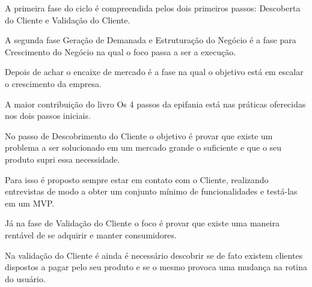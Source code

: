 \par A primeira fase do ciclo é compreendida pelos dois primeiros passos: Descoberta do Cliente e Validação do Cliente.
\par  A segunda fase Geração de Demanada e Estruturação do Negócio é a fase para Crescimento do Negócio na qual o foco passa a ser a execução. 
\par Depois de achar o encaixe de mercado é a fase na qual o objetivo está em escalar o crescimento da empresa.
\par A maior contribuição do livro Os 4 passos da epifania \cite{blank:03} está nas práticas oferecidas nos dois passos iniciais.
\par No passo de Descobrimento do Cliente o objetivo é provar que existe um problema a ser solucionado em um mercado grande o suficiente e que o seu produto supri essa necessidade.
\par Para isso é proposto sempre estar em contato com o Cliente, realizando entrevistas de modo a obter um conjunto mínimo de funcionalidades e testá-las em um  MVP.
\par Já na fase de Validação do Cliente o foco é provar que existe uma maneira rentável de se adquirir e manter consumidores.
\par Na validação do Cliente é ainda é necessário descobrir se de fato existem clientes dispostos a pagar pelo seu produto e se o mesmo provoca uma mudança na rotina do usuário.


